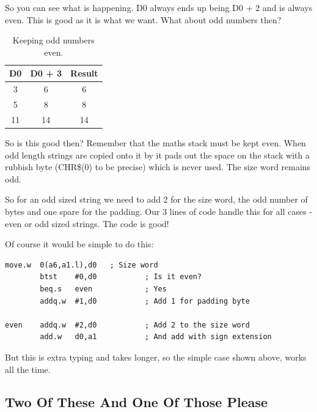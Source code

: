 So you can see what is happening. D0 always ends up being D0 + 2
      and is always even. This is good as it is what we want. What about odd
      numbers then?

\begin{table}[htbp]
\centering
\begin{tabular}{c c c}  %
\toprule
\textbf{D0} & \textbf{D0 + 3} & \textbf{Result} \\
\midrule
%
3 & 6 & 6\\
5 & 8 & 8\\
11 & 14 & 14\\
%
\bottomrule
\end{tabular}
\caption{Keeping odd numbers even.}
\label{tab:KeepingOddNumbersEven}
\end{table}


So is this good then? Remember that the maths stack must be kept
      even. When odd length strings are copied onto it by  it pads out
      the space on the stack with a rubbish byte (CHR\$(0) to be precise) which
      is never used. The size word remains odd.

So for an odd sized string we need to add 2 for the size word, the
      odd number of bytes and one spare for the padding. Our 3 lines of code
      handle this for all cases -{} even or odd sized strings. The code is good!

Of course it would be simple to do this:

\begin{lstlisting}[firstnumber=1,caption={Long Way to Keep Things Even},label={lst:LonegWayToKeepThingsEven}]
        move.w  0(a6,a1.l),d0   ; Size word
        btst    #0,d0           ; Is it even?
        beq.s   even            ; Yes
        addq.w  #1,d0           ; Add 1 for padding byte

even    addq.w  #2,d0           ; Add 2 to the size word
        add.w   d0,a1           ; And add with sign extension
\end{lstlisting}

But this is extra typing and takes longer, so the simple case
      shown above, works all the time.

\subsection{Two Of These And One Of Those Please}
\label{ch7-mixed-parameters}%

